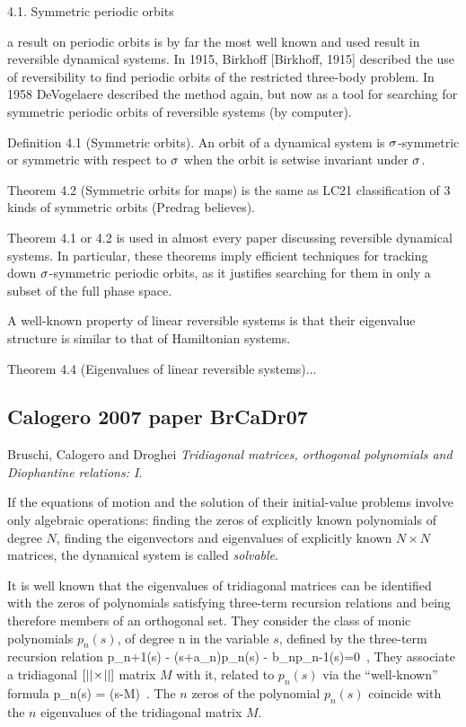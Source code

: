 {4.1. Symmetric periodic orbits

a result on periodic
orbits is by far the most well known and used result
in reversible dynamical systems. In 1915, Birkhoff
[Birkhoff, 1915] described the use of reversibility
to find periodic orbits of the restricted three-body
problem. In 1958 DeVogelaere
described the method again, but now as a tool for
searching for symmetric periodic orbits of reversible
systems (by computer).

Definition 4.1 (Symmetric orbits). An orbit
of a dynamical system is $\sigma$-symmetric
or symmetric with respect to $\sigma$ when the orbit
is setwise invariant under $\sigma$.

Theorem 4.2 (Symmetric orbits for maps)
is the same as LC21 classification of 3 kinds of symmetric orbits
(Predrag believes).

Theorem 4.1 or 4.2 is used in almost every paper discussing
reversible dynamical systems. In particular,
these theorems imply efficient techniques for tracking
down $\sigma$-symmetric periodic orbits, as it justifies
searching for them in only a subset of the full phase
space.

A well-known property of linear reversible systems
is that their eigenvalue structure is similar to that of
Hamiltonian systems.

Theorem 4.4 (Eigenvalues of linear reversible
systems)...


\subsection{Calogero 2007 paper {BrCaDr07}}
\label{sect:BrCaDr07}

Bruschi, Calogero and Droghei {\em Tridiagonal matrices,
orthogonal polynomials and {Diophantine} relations: {I}}.

If the equations of motion and the solution of their initial-value
problems involve only algebraic operations: finding the zeros of
explicitly known polynomials of degree $N$, finding the eigenvectors and
eigenvalues of explicitly known $N{\times}N$ matrices, the dynamical
system is called \emph{solvable}.

It is well known that the eigenvalues of tridiagonal matrices can be
identified with the zeros of polynomials satisfying three-term recursion
relations and being therefore members of an orthogonal set.
They consider the class of monic polynomials $p_{n}(s)$, of degree n in
the variable ${s}$, defined by the three-term recursion relation
\beq
p_{n+1}(s) - ({s}+a_n)p_{n}(s) - b_{n}p_{n-1}(s)=0
\,,
They associate a tridiagonal $[{||}\!\times\!{||}]$ matrix $M$
with it,
related to $p_{n}(s)$ via the ``well-known'' formula
\beq
p_{n}(s) = \det(s-M)
\,.
The $n$ zeros
of the polynomial $p_{n}(s)$ coincide with the $n$
eigenvalues of the tridiagonal matrix $M$.


}
